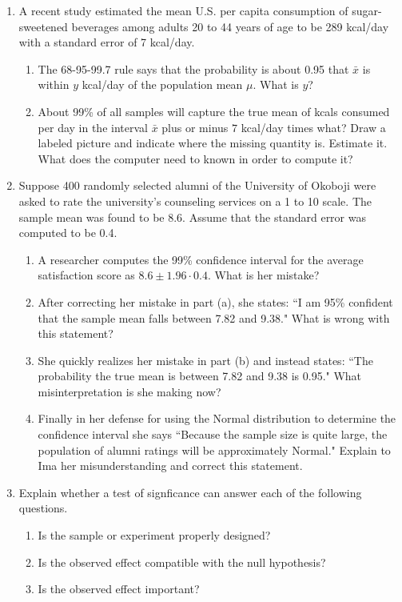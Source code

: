 \documentclass[10pt]{article}\usepackage[]{graphicx}\usepackage[]{color}
\begin{document}
  \begin{enumerate}
    \itemsep0in
    \item A recent study estimated the mean U.S. per capita consumption of sugar-sweetened beverages among adults 20 to 44 years of age to be 289 kcal/day with a standard error of 7 kcal/day.
    \begin{enumerate}
      \itemsep0.3in
      \item The 68-95-99.7 rule says that the probability is about 0.95 that $\bar{x}$ is within $y$ kcal/day of the population mean $\mu$. What is $y$? 
      \item About 99\% of all samples will capture the true mean of kcals consumed per day in the interval $\bar{x}$ plus or minus $7$ kcal/day times what? Draw a labeled picture and indicate where the missing quantity is. Estimate it. What does the computer need to known in order to compute it? 



      \vspace{0.2in}
    \end{enumerate}
    \item Suppose 400 randomly selected alumni of the University of Okoboji were asked to rate the university's counseling services on a 1 to 10 scale. The sample mean was found to be 8.6. Assume that the standard error was computed to be 0.4. 
    \begin{enumerate}
      \itemsep0.4in
      \item A researcher computes the 99\% confidence interval for the average satisfaction score as $8.6 \pm 1.96 \cdot 0.4$. What is her mistake? 
      \item After correcting her mistake in part (a), she states: ``I am 95\% confident that the sample mean falls between 7.82 and 9.38." What is wrong with this statement?
      \item She quickly realizes her mistake in part (b) and instead states: ``The probability the true mean is between 7.82 and 9.38 is 0.95." What misinterpretation is she making now? 
      \item Finally in her defense for using the Normal distribution to determine the confidence interval she says ``Because the sample size is quite large, the population of alumni ratings  will be approximately Normal." Explain to Ima her misunderstanding and correct this statement.
    \end{enumerate}
  
      \vspace{0.2in}
    \item Explain whether a test of signficance can answer each of the following questions.
    \begin{enumerate}
      \item Is the sample or experiment properly designed?
      \item Is the observed effect compatible with the null hypothesis?
      \item Is the observed effect important?
    \end{enumerate}
    

\end{enumerate}
\end{document}
